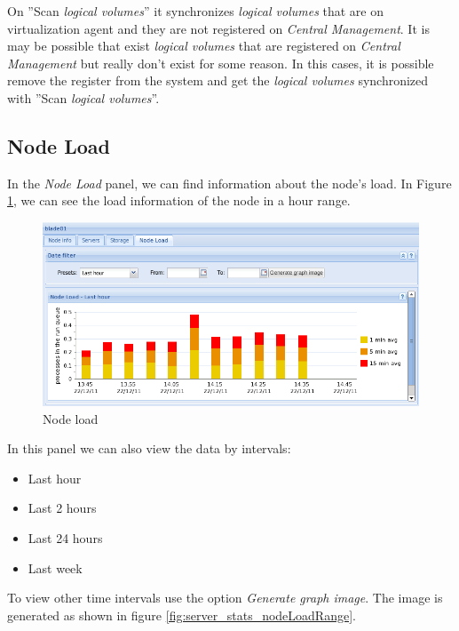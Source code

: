 On ''Scan \emph{logical volumes}'' it synchronizes \emph{logical volumes} that are on virtualization agent and they are not registered on \emph{Central Management}.
It is may be possible that exist \emph{logical volumes} that are registered on \emph{Central Management} but really don't exist for some reason.
In this cases, it is possible remove the register from the system and get the \emph{logical volumes} synchronized with ''Scan \emph{logical volumes}''.

\subsection{Node Load}
\label{sec:nodeload}
In the \emph{Node Load} panel, we can find information about the node's load. In Figure \ref{fig:node_load}, we can see the load information of the node in a hour range.



\begin{figure}[H]
        \begin{center}
        \includegraphics[scale=0.6]{screenshots/node_load.png}
        \caption{Node load}
        \label{fig:node_load}
        \end{center}
\end{figure}

In this panel we can also view the data by intervals:
\begin{itemize}
	\item Last hour
	\item Last 2 hours
	\item Last 24 hours
	\item Last week
\end{itemize}
To view other time intervals use the option \emph{Generate graph image}. The image is generated as shown in figure \ref{fig:server_stats_nodeLoadRange}.

